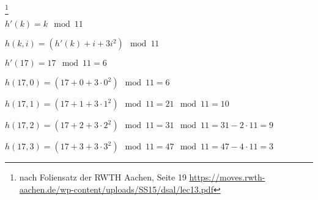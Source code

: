 \documentclass{bschlangaul-aufgabe}
\begin{document}

\footnote{nach Foliensatz der RWTH Aachen, Seite 19 \url{https://moves.rwth-aachen.de/wp-content/uploads/SS15/dsal/lec13.pdf}}

$h'(k) = k \mod 11$

$h(k, i) = (h'(k) + i + 3i^2) \mod 11$

$h'(17) = 17 \mod 11 = 6$


$h(17, 0) = (17 + 0 + 3 \cdot 0^2) \mod 11 = 6$

$h(17, 1) = (17 + 1 + 3 \cdot 1^2) \mod 11 = 21 \mod 11 = 10$

$h(17, 2) = (17 + 2 + 3 \cdot 2^2) \mod 11 = 31 \mod 11 = 31 - 2 \cdot 11 = 9$

$h(17, 3) = (17 + 3 + 3 \cdot 3^2) \mod 11 = 47 \mod 11 = 47 - 4 \cdot 11 = 3$
\end{document}
